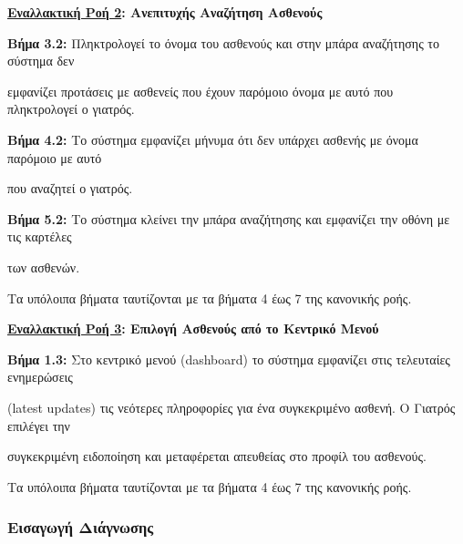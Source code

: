 \documentclass{article}
\begin{document}
\vspace{0.2cm}

\textbf{\underline{Εναλλακτική Ροή 2}: Ανεπιτυχής Αναζήτηση Ασθενούς}
\vspace{0.2cm}
\par \textbf{Βήμα 3.2:}  Πληκτρολογεί το όνομα του ασθενούς και στην μπάρα αναζήτησης το σύστημα δεν \par εμφανίζει προτάσεις με ασθενείς που έχουν παρόμοιο όνομα με αυτό που πληκτρολογεί ο γιατρός. \vspace{0.1cm}
\par \textbf{Βήμα 4.2:} Το σύστημα εμφανίζει μήνυμα ότι δεν υπάρχει ασθενής με όνομα παρόμοιο με αυτό \par που αναζητεί ο γιατρός. \vspace{0.1cm}
\par \textbf{Βήμα 5.2:} Το σύστημα κλείνει την μπάρα αναζήτησης και εμφανίζει την οθόνη με τις καρτέλες \par των ασθενών. \vspace{0.1cm}

\par Τα υπόλοιπα βήματα ταυτίζονται με τα βήματα 4 έως 7 της κανονικής ροής. \vspace{0.2cm}

\textbf{\underline{Εναλλακτική Ροή 3}: Επιλογή Ασθενούς από το Κεντρικό Μενού} \vspace{0.2cm}
\par \textbf{Βήμα 1.3:}  Στο κεντρικό μενού (dashboard) το σύστημα εμφανίζει στις τελευταίες ενημερώσεις \par (latest updates) τις νεότερες πληροφορίες για ένα συγκεκριμένο ασθενή. Ο Γιατρός επιλέγει την \par συγκεκριμένη ειδοποίηση και μεταφέρεται απευθείας στο προφίλ του ασθενούς. \vspace{0.1cm}

\par Τα υπόλοιπα βήματα ταυτίζονται με τα βήματα 4 έως 7 της κανονικής ροής.

\newpage

\subsubsection{Εισαγωγή Διάγνωσης}
 
\end{document}

